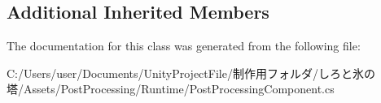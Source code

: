\subsection*{Additional Inherited Members}


The documentation for this class was generated from the following file\+:\begin{DoxyCompactItemize}
\item 
C\+:/\+Users/user/\+Documents/\+Unity\+Project\+File/制作用フォルダ/しろと氷の塔/\+Assets/\+Post\+Processing/\+Runtime/Post\+Processing\+Component.\+cs\end{DoxyCompactItemize}
